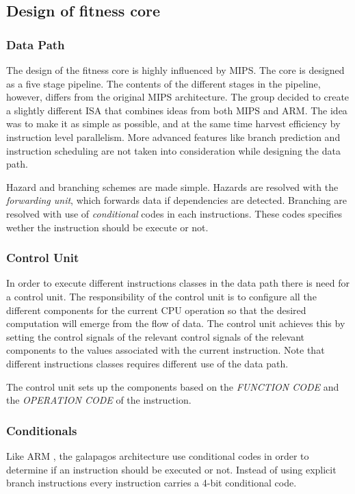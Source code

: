 \subsection{Design of fitness core} \label{fpga:fitness:ss:design_of_the_fitness_core}


\subsubsection{Data Path} \label{fpga:fitness:sss:data_path}
The design of the fitness core is highly influenced by MIPS. The core is designed as a five stage pipeline. The contents of the different stages in the pipeline, however, differs from the original MIPS architecture. The group decided to create a slightly different ISA that combines ideas from both MIPS and ARM. The idea was to make it as simple as possible, and at the same time harvest efficiency by instruction level parallelism. More advanced features like branch prediction and instruction scheduling are not taken into consideration while designing the data path. 

Hazard and branching schemes are made simple. Hazards are resolved with the \emph{forwarding unit}, which forwards data if dependencies are detected. Branching are resolved with use of \emph{conditional} codes in each instructions. These codes specifies wether the instruction should be execute or not. 



\subsubsection{Control Unit} \label{fpga:fitness:sss:control_unit}
In order to execute different instructions classes in the data path there is need for a control unit. The responsibility of the control unit is to configure all the different components for the current CPU operation so that the desired computation will emerge from the flow of data. The control unit achieves this by setting the control signals of the relevant control signals of the relevant components to the values associated with the current instruction. Note that different instructions classes requires different use of the data path.

The control unit sets up the components based on the \emph{FUNCTION CODE} and the \emph{OPERATION CODE} of the instruction.     



\subsubsection{Conditionals} \label{fpga:fitness:sss:conditionals}
Like ARM , the galapagos architecture use conditional codes in order to determine if an instruction should be executed or not. Instead of using explicit branch instructions every instruction carries a 4-bit conditional code. 


